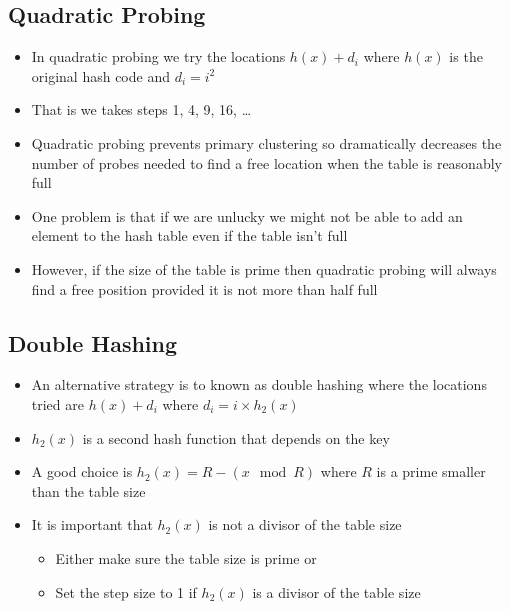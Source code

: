 
\begin{slide}
\section[-2]{Quadratic Probing}

\begin{PauseHighLight}
  \begin{itemize}
  \item In quadratic probing we try the locations $h(x)+d_i$ where
    $h(x)$ is the original hash code and $d_i=i^2$\pause
  \item That is we takes steps 1, 4, 9, 16, \ldots\pause
  \item Quadratic probing prevents primary clustering so dramatically
    decreases the number of probes needed to find a free location when
    the table is reasonably full\pause
  \item One problem is that if we are unlucky we might not be able to
    add an element to the hash table even if the table isn't full\pause
  \item However, if the size of the table is prime then quadratic
    probing will always find a free position provided it is not more
    than half full\pause
  \end{itemize}
\end{PauseHighLight}

\end{slide}


\begin{slide}
\section[-1]{Double Hashing}

\begin{PauseHighLight}
  \begin{itemize}
  \item An alternative strategy is to known as double hashing where the
    locations tried are $h(x)+d_i$ where $d_i = i\times h_2(x)$\pause
  \item $h_2(x)$ is a second hash function that depends on the
    key\pause
  \item A good choice is $h_2(x) = R - (x \mod R)$ where $R$ is a
    prime smaller than the table size\pause
  \item It is important that $h_2(x)$ is not a divisor of the
    table size\pause
    \begin{itemize}
    \item Either make sure the table size is prime or\pause
    \item Set the step size to 1 if $h_2(x)$ is a divisor of the table
      size\pause
    \end{itemize}
  \end{itemize}
\end{PauseHighLight}

\end{slide}

